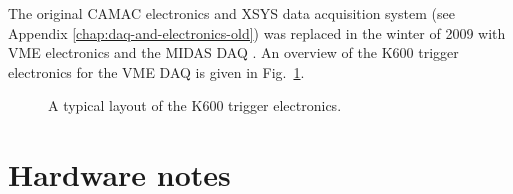 \documentclass[11pt]{report}
\begin{document}
The original CAMAC electronics and XSYS data acquisition system (see Appendix \ref{chap:daq-and-electronics-old})
was replaced in the winter of 2009 with VME electronics and the MIDAS DAQ \cite{Mid}. 
An overview of the K600 trigger electronics for the VME DAQ is given in 
Fig.~\ref{fig:k600-electronics-newdaq}.

\begin{figure}[!ht]
\centerline{\vspace{0cm}\hspace{0cm}
}
\centering
\caption{A typical layout of the K600 trigger electronics.}
\label{fig:k600-electronics-newdaq}
\end{figure} 

\section{Hardware notes}
\end{document}
